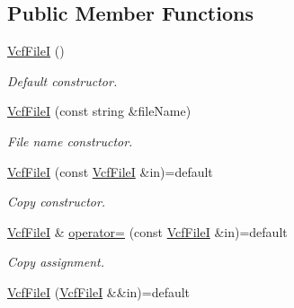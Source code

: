 \subsection*{Public Member Functions}
\begin{DoxyCompactItemize}
\item 
\mbox{\label{classsamp_files_1_1_vcf_file_i_a91b26cab24ec10961dd4e71ba83bcadc}} 
\hyperlink{classsamp_files_1_1_vcf_file_i_a91b26cab24ec10961dd4e71ba83bcadc}{Vcf\+FileI} ()
\begin{DoxyCompactList}\small\item\em Default constructor. \end{DoxyCompactList}\item 
\hyperlink{classsamp_files_1_1_vcf_file_i_a7d293b4303a5b293f8a3c27e4cc12f48}{Vcf\+FileI} (const string \&file\+Name)
\begin{DoxyCompactList}\small\item\em File name constructor. \end{DoxyCompactList}\item 
\mbox{\label{classsamp_files_1_1_vcf_file_i_aea8c5c1d14d64aae142a051792da6891}} 
\hyperlink{classsamp_files_1_1_vcf_file_i_aea8c5c1d14d64aae142a051792da6891}{Vcf\+FileI} (const \hyperlink{classsamp_files_1_1_vcf_file_i}{Vcf\+FileI} \&in)=default
\begin{DoxyCompactList}\small\item\em Copy constructor. \end{DoxyCompactList}\item 
\mbox{\label{classsamp_files_1_1_vcf_file_i_a09e7ba3c990255b4bf0688f895f5f084}} 
\hyperlink{classsamp_files_1_1_vcf_file_i}{Vcf\+FileI} \& \hyperlink{classsamp_files_1_1_vcf_file_i_a09e7ba3c990255b4bf0688f895f5f084}{operator=} (const \hyperlink{classsamp_files_1_1_vcf_file_i}{Vcf\+FileI} \&in)=default
\begin{DoxyCompactList}\small\item\em Copy assignment. \end{DoxyCompactList}\item 
\mbox{\label{classsamp_files_1_1_vcf_file_i_a96496e65f2557cd98a9df7639ccde54c}} 
\hyperlink{classsamp_files_1_1_vcf_file_i_a96496e65f2557cd98a9df7639ccde54c}{Vcf\+FileI} (\hyperlink{classsamp_files_1_1_vcf_file_i}{Vcf\+FileI} \&\&in)=default

\end{DoxyCompactItemize}
